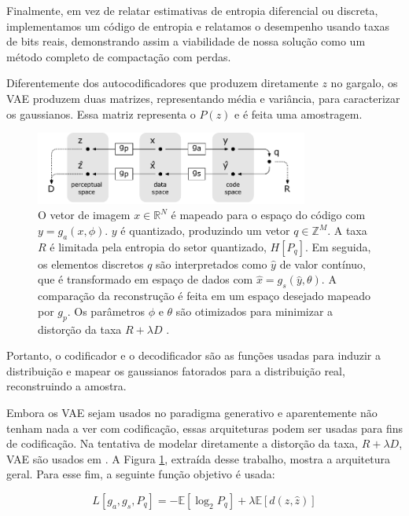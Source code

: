 Finalmente, em vez de relatar estimativas de entropia diferencial ou discreta, implementamos um código de entropia e relatamos o desempenho usando taxas de bits reais, demonstrando assim a viabilidade de nossa solução como um método completo de compactação com perdas.






Diferentemente dos autocodificadores que produzem diretamente $z$ no gargalo, os VAE produzem duas matrizes, representando média e variância, para caracterizar os gaussianos. Essa matriz representa o $P(z)$ e é feita uma amostragem. 

\begin{figure}
	\centering
	\includegraphics[width=0.80\textwidth]{figuras/balle_1.pdf}
	\caption{O vetor de imagem $x \in \mathbb{R}^N$ é mapeado para o espaço do código com $y = g_a(x,\phi)$. $y$ é quantizado, produzindo um vetor $q \in \mathbb {Z}^M $. A taxa $R$ é limitada pela entropia do setor quantizado, $H[P_q]$. Em seguida, os elementos discretos $ q $ são interpretados como $\hat{y}$ de valor contínuo, que é transformado em espaço de dados com $\hat{x} = g_s (\hat{y}, \theta)$. A comparação da reconstrução é feita em um espaço desejado mapeado por $g_p$. Os parâmetros $\phi$ e $\theta$ são otimizados para minimizar a distorção da taxa $R + \lambda D$ \cite{End2016Balle}.}
	\label{fig:balle1}
\end{figure}

Portanto, o codificador e o decodificador são as funções usadas para induzir a distribuição e mapear os gaussianos fatorados para a distribuição real, reconstruindo a amostra.

Embora os VAE sejam usados no paradigma generativo e aparentemente não tenham nada a ver com codificação, essas arquiteturas podem ser usadas para fins de codificação. Na tentativa de modelar diretamente a distorção da taxa, $R + \lambda D$, VAE são usados em \cite{End2016Balle}. A Figura \ref{fig:balle1}, extraída desse trabalho, mostra a arquitetura geral. Para esse fim, a seguinte função objetivo é usada:

\begin{equation}
L[g_a, g_s, P_q] = - \mathbb{E}[\log_2 P_q] + \lambda \mathbb{E}[d(z, \hat{z})]
\end{equation}

